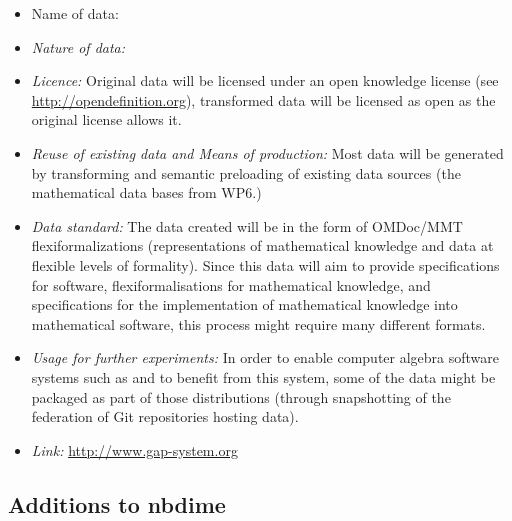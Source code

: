 \documentclass{deliverablereport}
\begin{document}
\begin{itemize}
\item{Name of data:}
\item\textit{Nature of data:}
\item\textit{Licence:} Original data will be licensed under an open knowledge license (see \url{http://opendefinition.org}), transformed data will be licensed as open as the original license allows it.
\item\textit{Reuse of existing data and Means of production:} Most data will be generated by transforming and semantic preloading of existing data sources (the mathematical data bases from WP6.)
\item\textit{Data standard:} The data created will be in the form of OMDoc/MMT flexiformalizations (representations of mathematical knowledge and data at flexible levels of formality). Since this data will aim to provide specifications for software, flexiformalisations for mathematical knowledge, and specifications for the implementation of mathematical knowledge into mathematical software, this process might require many different formats.
\item\textit{Usage for further experiments:} In order to enable computer algebra software systems such as \Sage and \GAP to benefit from this system, some of the data might be packaged as part of those distributions (through snapshotting of the federation of Git repositories hosting data).
\item\textit{Link:} \href{http://www.gap-system.org}{http://www.gap-system.org}
\end{itemize}


\subsection{Additions to nbdime}
\end{document}
